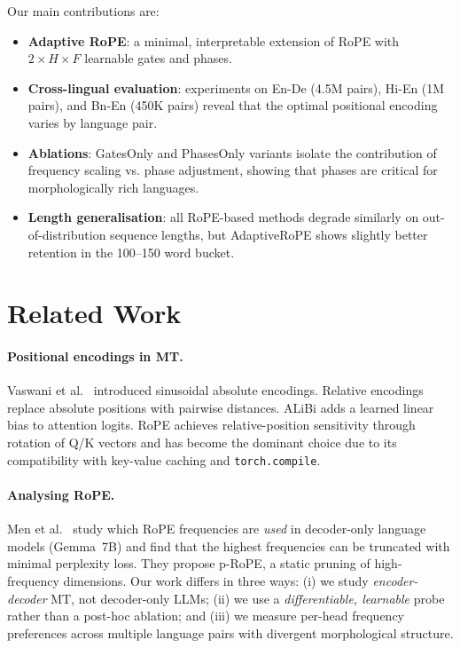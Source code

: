\documentclass[conference]{IEEEtran}
\begin{document}
Our main contributions are:
\begin{itemize}
  \item \textbf{Adaptive RoPE}: a minimal, interpretable extension of RoPE with
        $2 \times H \times F$ learnable gates and phases.
  \item \textbf{Cross-lingual evaluation}: experiments on En-De (4.5M pairs),
        Hi-En (1M pairs), and Bn-En (450K pairs) reveal that the optimal
        positional encoding varies by language pair.
  \item \textbf{Ablations}: GatesOnly and PhasesOnly variants isolate the
        contribution of frequency scaling vs. phase adjustment, showing that
        phases are critical for morphologically rich languages.
  \item \textbf{Length generalisation}: all RoPE-based methods degrade similarly
        on out-of-distribution sequence lengths, but AdaptiveRoPE shows
        slightly better retention in the 100--150 word bucket.
\end{itemize}

\section{Related Work}
\label{sec:related}

\paragraph{Positional encodings in MT.}
Vaswani et al.~\cite{vaswani2017attention} introduced sinusoidal absolute
encodings. Relative encodings \cite{shaw2018self,raffel2020exploring} replace
absolute positions with pairwise distances. ALiBi \cite{press2021train} adds a
learned linear bias to attention logits. RoPE \cite{su2021roformer} achieves
relative-position sensitivity through rotation of Q/K vectors and has become the
dominant choice due to its compatibility with key-value caching and
\texttt{torch.compile}.

\paragraph{Analysing RoPE.}
Men et al.~\cite{men2024roundandround} study which RoPE frequencies are
\emph{used} in decoder-only language models (Gemma~7B) and find that the highest
frequencies can be truncated with minimal perplexity loss. They propose p-RoPE,
a static pruning of high-frequency dimensions. Our work differs in three ways:
(i) we study \emph{encoder-decoder} MT, not decoder-only LLMs; (ii) we use a
\emph{differentiable, learnable} probe rather than a post-hoc ablation; and
(iii) we measure per-head frequency preferences across multiple language pairs
with divergent morphological structure.
\end{document}
